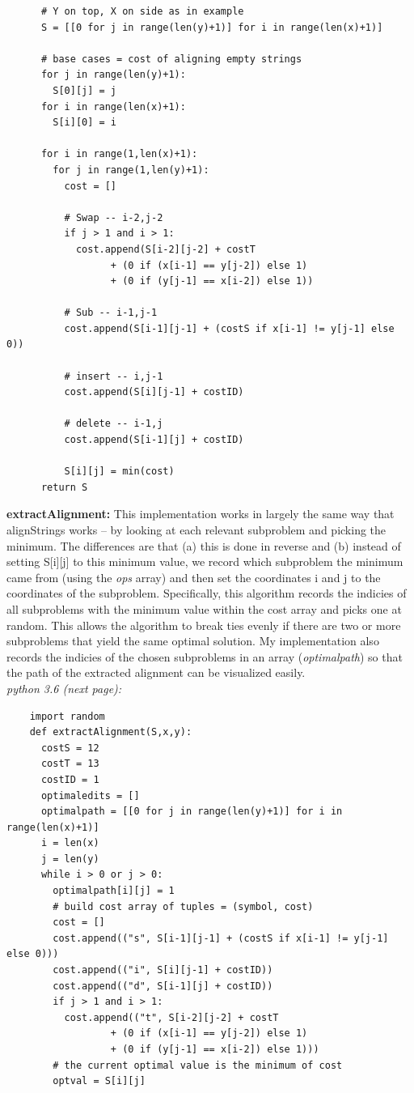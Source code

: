 \documentclass[11pt]{article} \setlength{\oddsidemargin}{0in}
\begin{document}
{\begin{enumerate}
\begin{verbatim}
      # Y on top, X on side as in example
      S = [[0 for j in range(len(y)+1)] for i in range(len(x)+1)]
      
      # base cases = cost of aligning empty strings 
      for j in range(len(y)+1):
        S[0][j] = j
      for i in range(len(x)+1):
        S[i][0] = i

      for i in range(1,len(x)+1):
        for j in range(1,len(y)+1):
          cost = []
          
          # Swap -- i-2,j-2
          if j > 1 and i > 1:
            cost.append(S[i-2][j-2] + costT
                  + (0 if (x[i-1] == y[j-2]) else 1)
                  + (0 if (y[j-1] == x[i-2]) else 1))
          
          # Sub -- i-1,j-1
          cost.append(S[i-1][j-1] + (costS if x[i-1] != y[j-1] else 0))
          
          # insert -- i,j-1
          cost.append(S[i][j-1] + costID)
          
          # delete -- i-1,j
          cost.append(S[i-1][j] + costID)
          
          S[i][j] = min(cost)
      return S
    \end{verbatim}
    \pagebreak

    \textbf{extractAlignment:}
    This implementation works in largely the same way that alignStrings works -- by looking at each relevant subproblem and picking the minimum. The differences are that (a) this is done in reverse and (b) instead of setting S[i][j] to this minimum value, we record which subproblem the minimum came from (using the \textit{ops} array) and then set the coordinates i and j to the coordinates of the subproblem. Specifically, this algorithm records the indicies of all subproblems with the minimum value within the cost array and picks one at random. This allows the algorithm to break ties evenly if there are two or more subproblems that yield the same optimal solution. My implementation also records the indicies of the chosen subproblems in an array (\textit{optimalpath}) so that the path of the extracted alignment can be visualized easily. \\
    \textit{python 3.6 (next page):}
    \pagebreak
    \begin{verbatim}
    import random
    def extractAlignment(S,x,y):
      costS = 12
      costT = 13
      costID = 1
      optimaledits = []
      optimalpath = [[0 for j in range(len(y)+1)] for i in range(len(x)+1)]
      i = len(x)
      j = len(y)
      while i > 0 or j > 0:
        optimalpath[i][j] = 1
        # build cost array of tuples = (symbol, cost)   
        cost = []
        cost.append(("s", S[i-1][j-1] + (costS if x[i-1] != y[j-1] else 0))) 
        cost.append(("i", S[i][j-1] + costID))
        cost.append(("d", S[i-1][j] + costID))
        if j > 1 and i > 1:
          cost.append(("t", S[i-2][j-2] + costT 
                  + (0 if (x[i-1] == y[j-2]) else 1)
                  + (0 if (y[j-1] == x[i-2]) else 1)))
        # the current optimal value is the minimum of cost
        optval = S[i][j]
        

\end{verbatim}
\end{enumerate}}
\end{document}
